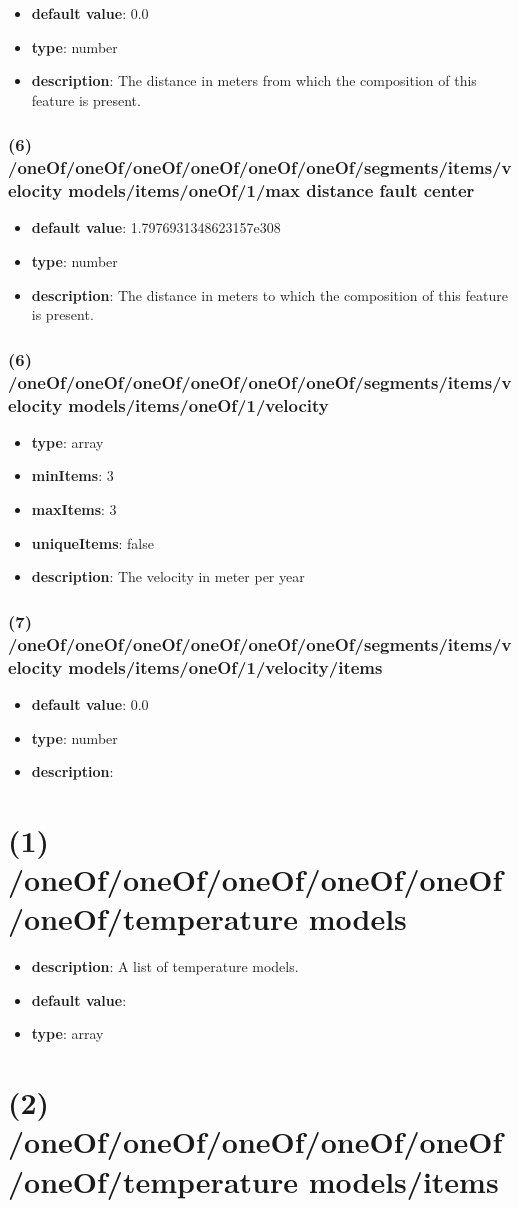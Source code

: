 \begin{itemize}[leftmargin=6em]\item {\bf default value}: 0.0
\item {\bf type}: number
\item {\bf description}: The distance in meters from which the composition of this feature is present.
\end{itemize}\subsubsection{(6) /oneOf/oneOf/oneOf/oneOf/oneOf/oneOf/segments/items/velocity models/items/oneOf/1/max distance fault center}
\begin{itemize}[leftmargin=6em]\item {\bf default value}: 1.7976931348623157e308
\item {\bf type}: number
\item {\bf description}: The distance in meters to which the composition of this feature is present.
\end{itemize}\subsubsection{(6) /oneOf/oneOf/oneOf/oneOf/oneOf/oneOf/segments/items/velocity models/items/oneOf/1/velocity}
\begin{itemize}[leftmargin=6em]\item {\bf type}: array
\item {\bf minItems}: 3
\item {\bf maxItems}: 3
\item {\bf uniqueItems}: false
\item {\bf description}: The velocity in meter per year
\end{itemize}\subsubsection{(7) /oneOf/oneOf/oneOf/oneOf/oneOf/oneOf/segments/items/velocity models/items/oneOf/1/velocity/items}
\begin{itemize}[leftmargin=7em]\item {\bf default value}: 0.0
\item {\bf type}: number
\item {\bf description}: 
\end{itemize}\section{(1) /oneOf/oneOf/oneOf/oneOf/oneOf/oneOf/temperature models}
\begin{itemize}[leftmargin=1em]\item {\bf description}: A list of temperature models.
\item {\bf default value}: 
\item {\bf type}: array
\end{itemize}\section{(2) /oneOf/oneOf/oneOf/oneOf/oneOf/oneOf/temperature models/items}

